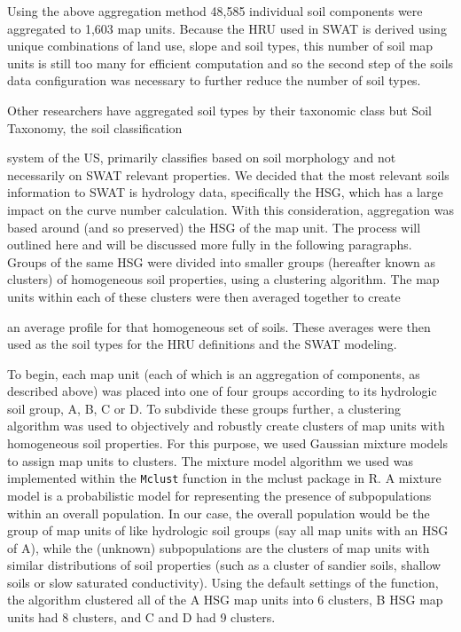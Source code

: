 Using the above aggregation method 48,585 individual soil components were
aggregated to 1,603 map units. Because the HRU used in
SWAT is derived using unique combinations of land use, slope and soil types,
this number of soil map units is still too many for efficient computation  and so
the second step of the soils data configuration was necessary to further reduce
the number of soil types.

Other researchers have aggregated soil types by their taxonomic class
\citep{gatzke_aggregation_2011} but Soil Taxonomy, the soil classification

system of the US, primarily classifies based on soil morphology and not
necessarily on SWAT relevant properties. We decided that the most relevant soils
information to SWAT is hydrology data, specifically the HSG, which has a large impact on the curve number calculation. With this
consideration, aggregation was based around (and so preserved) the HSG of the
map unit. The process will outlined here and will be discussed more fully in the following 
paragraphs. Groups of the same HSG were divided into smaller groups (hereafter
known as clusters) of homogeneous soil properties, using a clustering algorithm.
The map units within each of these clusters were then averaged together to create

an average profile for that homogeneous set of soils. These averages were then
used as the soil types for the HRU definitions and the SWAT modeling.

To begin, each map unit (each of which is an aggregation of components, as described above)
 was placed into one of four groups according to its hydrologic soil
group, A, B, C or D. To subdivide these groups further, a clustering algorithm
was used to objectively and robustly create clusters of map units with
homogeneous soil properties. For this purpose, we used Gaussian mixture models to
assign map units to clusters. The mixture model algorithm we used was implemented within the
\texttt{Mclust} function in the mclust package \citep{fraley_mclust_2012} in R.
A mixture model is a probabilistic model for representing the presence of
subpopulations within an overall population. In our case, the overall population
would be the group of map units of like hydrologic soil groups (say all map units
with an HSG of A), while the (unknown) subpopulations are the clusters of
map units with similar distributions of soil properties (such as a cluster of
sandier soils, shallow soils or slow saturated conductivity). Using the default
settings of the function, the algorithm clustered all of the A HSG map units into
6 clusters, B HSG map units had 8 clusters, and C and D had 9 clusters.

